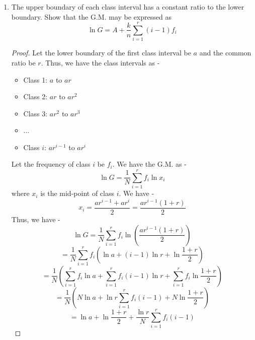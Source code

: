 \begin{enumerate}
    For the initial median of 35.5, we have -
    \[35.5 = 31 + \left(\frac{\frac{N}{2} - (F + f_1)}{f_2}\right) \cdot 10\]
    \[\Rightarrow 4.5 = \left(\frac{\frac{N}{2} - F - f_1}{f_2}\right) \cdot 10\]
    \[\Rightarrow \frac{N}{2} - F - f_1 = \frac{4.5 f_2}{10} = 0.45 f_2 \quad \text{(1)}\]
    For the corrected median of 36.5, we have -
    \[36.5 = 31 + \left(\frac{\frac{N}{2} - (F + f_1 - 2)}{f_2 + 2}\right) \cdot 10\]
    \[\Rightarrow 5.5 = \left(\frac{\frac{N}{2} - F - f_1 + 2}{f_2 + 2}\right) \cdot 10\]
    \[\Rightarrow \frac{N}{2} - F - f_1 + 2 = \frac{5.5 (f_2 + 2)}{10} = 0.55 f_2 + 1.1 \quad \text{(2)}\]
    Subtracting (1) from (2), we get -
    \[2 = (0.55 f_2 + 1.1) - (0.45 f_2)\]
    \[2 = 0.1 f_2 + 1.1\]   
    \[\Rightarrow 0.9 = 0.1 f_2\]
    \[\Rightarrow f_2 = 9\]
    Therefore, the corrected frequency of the class 31-40 is given by -
    \[\boxed{f_2 + 2 = 9 + 2 = 11
    }\]
    \item The upper boundary of each class interval has a constant ratio to the lower boundary. Show that the G.M. may be expressed as 
    $$\ln G = A + \frac{k}{n} \sum_{i=1}^{r} (i-1)f_i$$
    \begin{proof}
    Let the lower boundary of the first class interval be $a$ and the common ratio be $r$. Thus, we have the class intervals as -
    \begin{itemize}
        \item Class 1: $a$ to $ar$
        \item Class 2: $ar$ to $ar^2$
        \item Class 3: $ar^2$ to $ar^3$
        \item $\ldots$
        \item Class $i$: $ar^{i-1}$ to $ar^i$
    \end{itemize}
    Let the frequency of class $i$ be $f_i$. We have the G.M. as -  
    \[\ln G = \frac{1}{N} \sum_{i=1}^{r} f_i \ln x_i\]
    where $x_i$ is the mid-point of class $i$. We have -
    \[x_i = \frac{ar^{i-1} + ar^i}{2} = \frac{a r^{i-1} (1 + r)}{2}\]
    Thus, we have -
    \[\ln G = \frac{1}{N} \sum_{i=1}^{r} f_i \ln \left(\frac{a r^{i-1} (1 + r)}{2}\right)\]
    \[= \frac{1}{N} \sum_{i=1}^{r} f_i \left(\ln a + (i-1) \ln r + \ln \frac{1 + r}{2}\right)\]
    \[= \frac{1}{N} \left(\sum_{i=1}^{r} f_i \ln a + \sum_{i=1}^{r} f_i (i-1) \ln r + \sum_{i=1}^{r} f_i \ln \frac{1 + r}{2}\right)\]
    \[= \frac{1}{N} \left(N \ln a + \ln r \sum_{i=1}^{r} f_i (i-1) + N \ln \frac{1 + r}{2}\right)\]
    \[= \ln a + \ln \frac{1 + r}{2} + \frac{\ln r}{N} \sum_{i=1}^{r} f_i (i-1)\]

\end{proof}
\end{enumerate}
